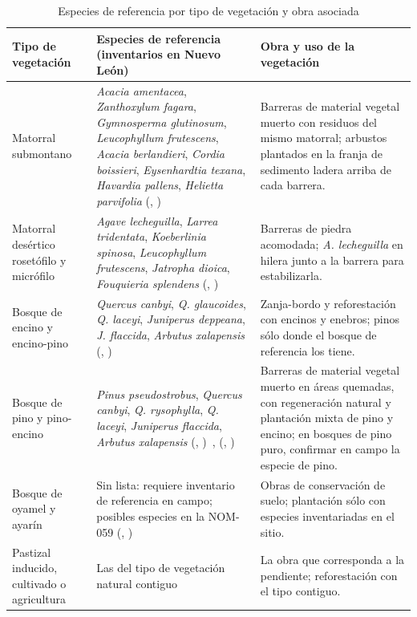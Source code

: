 \documentclass[11pt,letterpaper]{article}
\makeatletter
\newcommand{\citap}[1]{(\@nameuse{cautor@#1}, \@nameuse{canio@#1})~\cite{#1}}
\makeatother
\begin{document}
\begin{table}[H]\centering\footnotesize
\caption{Especies de referencia por tipo de vegetación y obra asociada}\label{tab:especies}
\begin{tabularx}{\linewidth}{>{\raggedright\arraybackslash}p{3.3cm}>{\raggedright\arraybackslash}X>{\raggedright\arraybackslash}p{3.9cm}}
\toprule
Tipo de vegetación & Especies de referencia (inventarios en Nuevo León) & Obra y uso de la vegetación \\
\midrule
Matorral submontano & \emph{Acacia amentacea}, \emph{Zanthoxylum fagara}, \emph{Gymnosperma glutinosum}, \emph{Leucophyllum frutescens}, \emph{Acacia berlandieri}, \emph{Cordia boissieri}, \emph{Eysenhardtia texana}, \emph{Havardia pallens}, \emph{Helietta parvifolia} \citap{alanis2015a} & Barreras de material vegetal muerto con residuos del mismo matorral; arbustos plantados en la franja de sedimento ladera arriba de cada barrera. \\
Matorral desértico rosetófilo y micrófilo & \emph{Agave lecheguilla}, \emph{Larrea tridentata}, \emph{Koeberlinia spinosa}, \emph{Leucophyllum frutescens}, \emph{Jatropha dioica}, \emph{Fouquieria splendens} \citap{alanis2015b} & Barreras de piedra acomodada; \emph{A. lecheguilla} en hilera junto a la barrera para estabilizarla. \\
Bosque de encino y encino-pino & \emph{Quercus canbyi}, \emph{Q. glaucoides}, \emph{Q. laceyi}, \emph{Juniperus deppeana}, \emph{J. flaccida}, \emph{Arbutus xalapensis} \citap{ramirez2013} & Zanja-bordo y reforestación con encinos y enebros; pinos sólo donde el bosque de referencia los tiene. \\
Bosque de pino y pino-encino & \emph{Pinus pseudostrobus}, \emph{Quercus canbyi}, \emph{Q. rysophylla}, \emph{Q. laceyi}, \emph{Juniperus flaccida}, \emph{Arbutus xalapensis} \citap{jimenez2013}, \citap{ramirez2013} & Barreras de material vegetal muerto en áreas quemadas, con regeneración natural y plantación mixta de pino y encino; en bosques de pino puro, confirmar en campo la especie de pino. \\
Bosque de oyamel y ayarín & Sin lista: requiere inventario de referencia en campo; posibles especies en la NOM-059 \citap{nom059} & Obras de conservación de suelo; plantación sólo con especies inventariadas en el sitio. \\
Pastizal inducido, cultivado o agricultura & Las del tipo de vegetación natural contiguo & La obra que corresponda a la pendiente; reforestación con el tipo contiguo. \\
\bottomrule
\end{tabularx}
\end{table}
\end{document}
